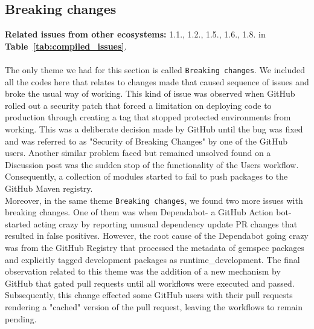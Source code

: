 \documentclass[conference]{IEEEtran}
\begin{document}
\subsection*{\textbf{Breaking changes}}
\textbf{Related issues from other ecosystems:} 1.1., 1.2., 1.5., 1.6., 1.8. in \textbf{Table~\ref{tab:compiled_issues}}.\\\\
The only theme we had for this section is called \texttt{Breaking changes}. We included all the codes here that relates to changes made that caused sequence of issues and broke the usual way of working. This kind of issue was observed when GitHub rolled out a security patch that forced a limitation on deploying code to production through creating a tag that stopped protected environments from working. This was a deliberate decision made by GitHub until the bug was fixed and was referred to as "Security of Breaking Changes" by one of the GitHub users. Another similar problem faced but remained unsolved found on a Discussion post was the sudden stop of the functionality of the Users workflow. Consequently, a collection of modules started to fail to push packages to the GitHub Maven registry.\\
Moreover, in the same theme \texttt{Breaking changes}, we found two more issues with breaking changes. One of them was when Dependabot- a GitHub Action bot- started acting crazy by reporting unusual dependency update PR changes that resulted in false positives. However, the root cause of the Dependabot going crazy was from the GitHub Registry that processed the metadata of gemspec packages and explicitly tagged development packages as runtime\_development.  The final observation related to this theme was the addition of a new mechanism by GitHub that gated pull requests until all workflows were executed and passed.  Subsequently, this change effected some GitHub users with their pull requests rendering a "cached" version of the pull request, leaving the workflows to remain pending. 
\end{document}
